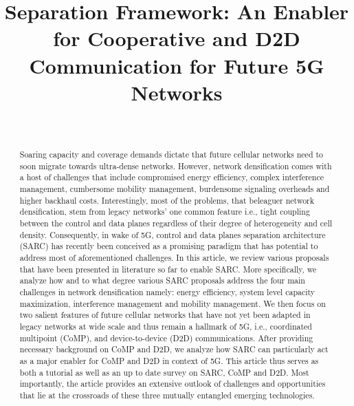 \documentclass[article,10pt,twocolumn]{IEEEtran}
\begin{document}
\title{Separation Framework: An Enabler for Cooperative and D2D Communication for Future 5G Networks}

\author{\\
}

\maketitle

\begin{abstract}
Soaring capacity and coverage demands dictate that future cellular networks need to soon migrate towards ultra-dense networks. However, network densification comes with a host of challenges that include compromised energy efficiency, complex interference management, cumbersome mobility management, burdensome signaling overheads and higher backhaul costs. Interestingly, most of the problems, that beleaguer network densification, stem from legacy networks’ one common feature i.e., tight coupling between the control and data planes regardless of their degree of heterogeneity and cell density. Consequently, in wake of 5G, control and data planes separation architecture (SARC) has recently been conceived as a promising paradigm that has potential to address most of aforementioned challenges. In this article, we review various proposals that have been presented in literature so far to enable SARC. More specifically, we analyze how and to what degree various SARC proposals address the four main challenges in network densification namely: energy efficiency, system level capacity maximization, interference management and mobility management. We then focus on two salient features of future cellular networks that have not yet been adapted in legacy networks at wide scale and thus remain a hallmark of 5G, i.e., coordinated multipoint (CoMP), and device-to-device (D2D) communications. After providing necessary background on CoMP and D2D, we analyze how SARC can particularly act as a major enabler for CoMP and D2D in context of 5G. This article thus serves as both a tutorial as well as an up to date survey on SARC, CoMP and D2D. Most importantly, the article provides an extensive outlook of challenges and opportunities that lie at the crossroads of these three mutually entangled emerging technologies.
\end{abstract}
\end{document}

